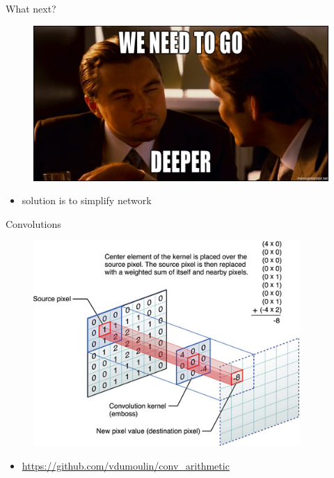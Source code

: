 \documentclass{beamer}
\begin{document}
\begin{frame}{What next?}

\begin{figure}[h!]
  \centering
  \includegraphics[width=1\textwidth]{images/inception.png}
\end{figure}

\begin{itemize}
\item solution is to simplify network
\end{itemize}

\end{frame}


\begin{frame}{Convolutions}

\begin{figure}[h!]
  \centering
  \includegraphics[width=0.9\textwidth]{images/kernel_convolution.jpg}
\end{figure}

\begin{itemize}
\item \url{https://github.com/vdumoulin/conv_arithmetic}
\end{itemize}

\end{frame}
\end{document}
